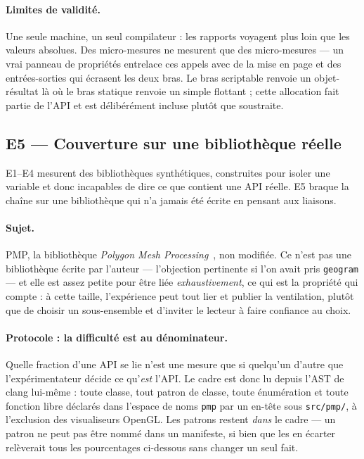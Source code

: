 \documentclass[11pt,a4paper]{article}
\newcommand{\code}[1]{\texttt{\small #1}}
\begin{document}
\paragraph{Limites de validité.} Une seule machine, un seul compilateur : les
rapports voyagent plus loin que les valeurs absolues. Des micro-mesures ne
mesurent que des micro-mesures --- un vrai panneau de propriétés entrelace ces
appels avec de la mise en page et des entrées-sorties qui écrasent les deux bras.
Le bras scriptable renvoie un objet-résultat là où le bras statique renvoie un
simple flottant ; cette allocation fait partie de l'API et est délibérément
incluse plutôt que soustraite.

\subsection{E5 --- Couverture sur une bibliothèque réelle}
\label{sec:e5}

E1--E4 mesurent des bibliothèques synthétiques, construites pour isoler une
variable et donc incapables de dire ce que contient une API réelle. E5 braque la
chaîne sur une bibliothèque qui n'a jamais été écrite en pensant aux liaisons.

\paragraph{Sujet.} PMP, la bibliothèque \emph{Polygon Mesh
Processing}~\cite{pmp}, non modifiée. Ce n'est pas une bibliothèque écrite par
l'auteur --- l'objection pertinente si l'on avait pris \code{geogram} --- et elle
est assez petite pour être liée \emph{exhaustivement}, ce qui est la propriété
qui compte : à cette taille, l'expérience peut tout lier et publier la
ventilation, plutôt que de choisir un sous-ensemble et d'inviter le lecteur à
faire confiance au choix.

\paragraph{Protocole : la difficulté est au dénominateur.} \og Quelle fraction
d'une API se lie \fg{} n'est une mesure que si quelqu'un d'autre que
l'expérimentateur décide ce qu'\emph{est} l'API. Le cadre est donc lu depuis
l'AST de clang lui-même : toute classe, tout patron de classe, toute énumération
et toute fonction libre déclarés dans l'espace de noms \code{pmp} par un en-tête
sous \code{src/pmp/}, à l'exclusion des visualiseurs OpenGL. Les patrons restent
\emph{dans} le cadre --- un patron ne peut pas être nommé dans un manifeste, si
bien que les en écarter relèverait tous les pourcentages ci-dessous sans changer
un seul fait.
\end{document}
